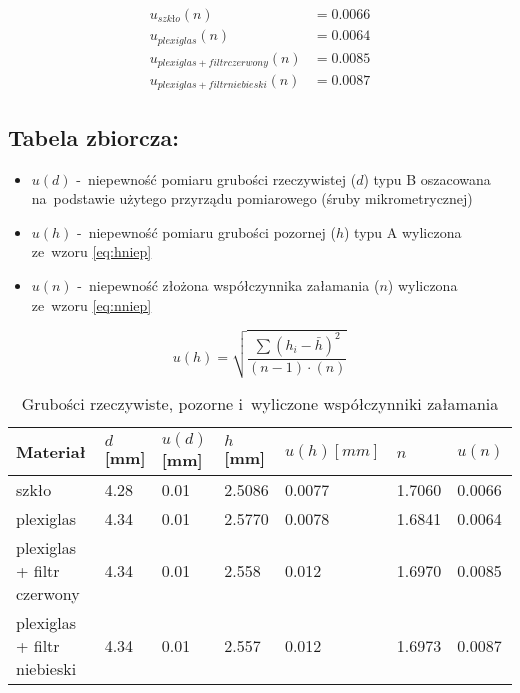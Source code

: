 \documentclass{fizraport}
\begin{document}
\begin{equation*}
\begin{split}
u_{szkło}(n)&=0.0066 \\
u_{plexiglas}(n)&=0.0064 \\
u_{plexiglas+filtr czerwony}(n)&=0.0085 \\
u_{plexiglas+filtr niebieski}(n)&=0.0087 
\end{split}
\end{equation*}

\subsection{Tabela zbiorcza:}%
\begin{itemize}
   \item  $u(d)$ -~niepewność pomiaru grubości rzeczywistej ($d$) typu B oszacowana na~podstawie użytego przyrządu pomiarowego (śruby mikrometrycznej) 
  \item $u(h)$ -~niepewność pomiaru grubości pozornej ($h$) typu A wyliczona ze~wzoru \ref{eq:hniep}
  \item $u(n)$ -~niepewność złożona współczynnika załamania ($n$) wyliczona ze~wzoru \ref{eq:nniep}  
\end{itemize}
\begin{equation}
    \label{eq:hniep}
    u(h) = \sqrt{\frac{ \displaystyle\sum{(h_i-\bar{h})^2}}
    {(n-1)\cdot(n)}}
\end{equation}
\begin{table}[h]
\centering
\caption{Grubości rzeczywiste, pozorne i~wyliczone współczynniki załamania}
\label{tab:wszystko}
\begin{tabular}{|l|l|l|l|l|l|l|}
\hline
\textbf{Materiał}           & $d$[mm]&$u(d)$[mm]& $h$[mm]& $u(h)[mm]$ & $n$~   & $u(n)$ \\ \hline
szkło                       &   4.28 &     0.01 & 2.5086 &     0.0077 & 1.7060 & 0.0066 \\ \hline
plexiglas                   &   4.34 &     0.01 & 2.5770 &     0.0078 & 1.6841 & 0.0064 \\ \hline
plexiglas + filtr czerwony  &   4.34 &     0.01 & 2.558~ &     0.012~ & 1.6970 & 0.0085 \\ \hline
plexiglas + filtr niebieski &   4.34 &     0.01 & 2.557~ &     0.012~ & 1.6973 & 0.0087 \\ \hline
\end{tabular}
\end{table}
\newpage
\end{document}
